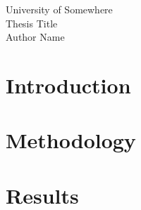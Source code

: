 \documentclass[12pt]{article}
\begin{document}
\begin{center}
    {\Large University of Somewhere}\\
    \vspace{1em}
    {\Huge Thesis Title}\\
    \vspace{1em}
    Author Name
\end{center}

\vspace{2cm}

\section{Introduction}
\lipsum[1-2]

\section{Methodology}
\lipsum[3]

\section{Results}
\lipsum[4]
\end{document}
